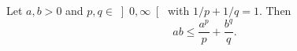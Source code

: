 \documentclass[12pt]{article}
\begin{document}
Let $a,b>0$ and $p,q\in \left]0,\infty\right[$ with $1/p+1/q=1$. Then
\[
  ab \le \frac{a^p}p + \frac{b^q}q.
\]
\end{document}
